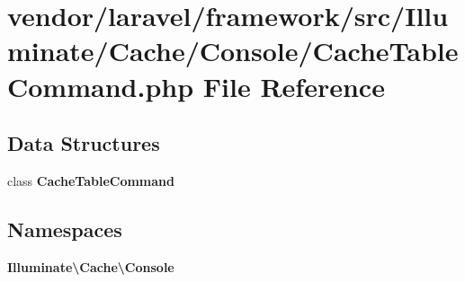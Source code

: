 \section{vendor/laravel/framework/src/\+Illuminate/\+Cache/\+Console/\+Cache\+Table\+Command.php File Reference}
\label{_cache_table_command_8php}
\subsection*{Data Structures}
\begin{DoxyCompactItemize}
\item 
class {\bf Cache\+Table\+Command}
\end{DoxyCompactItemize}
\subsection*{Namespaces}
\begin{DoxyCompactItemize}
\item 
 {\bf Illuminate\textbackslash{}\+Cache\textbackslash{}\+Console}
\end{DoxyCompactItemize}
